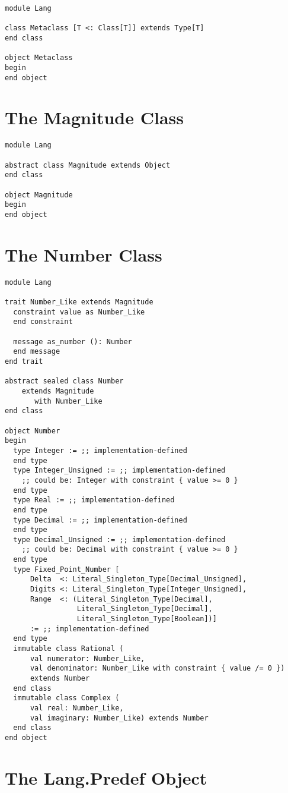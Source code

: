 \begin{lstlisting}
module Lang

class Metaclass [T <: Class[T]] extends Type[T]
end class

object Metaclass
begin
end object
\end{lstlisting}






\section{The Magnitude Class}
\label{sec:lang-magnitude}

\begin{lstlisting}
module Lang

abstract class Magnitude extends Object
end class

object Magnitude
begin
end object
\end{lstlisting}






\section{The Number Class}
\label{sec:lang-number}

\begin{lstlisting}
module Lang

trait Number_Like extends Magnitude
  constraint value as Number_Like 
  end constraint
  
  message as_number (): Number 
  end message
end trait

abstract sealed class Number 
    extends Magnitude
       with Number_Like
end class

object Number
begin
  type Integer := ;; implementation-defined
  end type
  type Integer_Unsigned := ;; implementation-defined
    ;; could be: Integer with constraint { value >= 0 }
  end type
  type Real := ;; implementation-defined
  end type
  type Decimal := ;; implementation-defined
  end type
  type Decimal_Unsigned := ;; implementation-defined
    ;; could be: Decimal with constraint { value >= 0 }
  end type
  type Fixed_Point_Number [
      Delta  <: Literal_Singleton_Type[Decimal_Unsigned],
      Digits <: Literal_Singleton_Type[Integer_Unsigned],
      Range  <: (Literal_Singleton_Type[Decimal],
                 Literal_Singleton_Type[Decimal], 
                 Literal_Singleton_Type[Boolean])]
      := ;; implementation-defined
  end type
  immutable class Rational (
      val numerator: Number_Like, 
      val denominator: Number_Like with constraint { value /= 0 }) 
      extends Number
  end class
  immutable class Complex (
      val real: Number_Like,
      val imaginary: Number_Like) extends Number
  end class
end object
\end{lstlisting}







\section{The Lang.Predef Object}
\label{sec:lang-predef}




